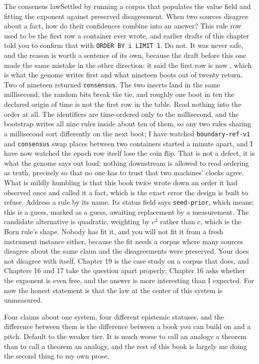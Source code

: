 \begin{Open}{The consensus law}{Settled by running a corpus that populates the value field and fitting the exponent against preserved disagreement.}
When two sources disagree about a fact, how do their confidences combine into an answer? This rule row used to be the first row a container ever wrote, and earlier drafts of this chapter told you to confirm that with \texttt{ORDER BY i LIMIT 1}. Do not. It was never safe, and the reason is worth a sentence of its own, because the draft before this one made the same mistake in the other direction: it said the first row is now , which is what the genome writes first and what nineteen boots out of twenty return. Two of nineteen returned \texttt{consensus}. The two inserts land in the same millisecond, the random bits break the tie, and roughly one boot in ten the declared origin of time is not the first row in the table. Read nothing into the order at all. The identifiers are time-ordered only to the millisecond, and the bootstrap writes all nine rules inside about ten of them, so any two rules sharing a millisecond sort differently on the next boot; I have watched \texttt{boundary-ref-v1} and \texttt{consensus} swap places between two containers started a minute apart, and I have now watched the epoch row itself lose the coin flip. That is not a defect, it is what the genome says out loud: nothing downstream is allowed to read ordering as truth, precisely so that no one has to trust that two machines' clocks agree. What is mildly humbling is that this book twice wrote down an order it had observed once and called it a fact, which is the exact error the design is built to refuse. Address a rule by its name. Its status field says \texttt{seed-prior}, which means: this is a guess, marked as a guess, awaiting replacement by a measurement. The candidate alternative is quadratic, weighting by $c^2$ rather than $c$, which is the Born rule's shape. Nobody has fit it, and you will not fit it from a fresh instrument instance either, because the fit needs a corpus where many sources disagree about the same claim and the disagreements were preserved. Your \labColdSystemShort{} does not disagree with itself. Chapter 19 is the case study on a corpus that does, and Chapters 16 and 17 take the question apart properly; Chapter 16 asks whether the exponent is even free, and the answer is more interesting than I expected. For now the honest statement is that the law at the center of this system is unmeasured.
\end{Open}

Four claims about one system, four different epistemic statuses, and the difference between them is the difference between a book you can build on and a pitch. Default to the weaker tier. It is much worse to call an analogy a theorem than to call a theorem an analogy, and the rest of this book is largely me doing the second thing to my own prose.

